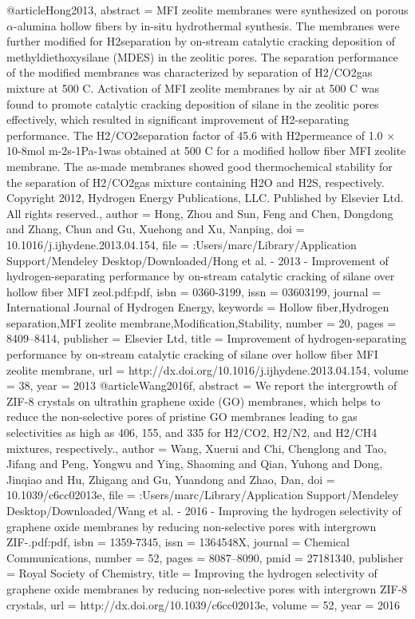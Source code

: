 @article{Hong2013,
abstract = {MFI zeolite membranes were synthesized on porous $\alpha$-alumina hollow fibers by in-situ hydrothermal synthesis. The membranes were further modified for H2separation by on-stream catalytic cracking deposition of methyldiethoxysilane (MDES) in the zeolitic pores. The separation performance of the modified membranes was characterized by separation of H2/CO2gas mixture at 500 C. Activation of MFI zeolite membranes by air at 500 C was found to promote catalytic cracking deposition of silane in the zeolitic pores effectively, which resulted in significant improvement of H2-separating performance. The H2/CO2separation factor of 45.6 with H2permeance of 1.0 × 10-8mol m-2s-1Pa-1was obtained at 500 C for a modified hollow fiber MFI zeolite membrane. The as-made membranes showed good thermochemical stability for the separation of H2/CO2gas mixture containing H2O and H2S, respectively. {\textcopyright} Copyright {\textcopyright} 2012, Hydrogen Energy Publications, LLC. Published by Elsevier Ltd. All rights reserved.},
author = {Hong, Zhou and Sun, Feng and Chen, Dongdong and Zhang, Chun and Gu, Xuehong and Xu, Nanping},
doi = {10.1016/j.ijhydene.2013.04.154},
file = {:Users/marc/Library/Application Support/Mendeley Desktop/Downloaded/Hong et al. - 2013 - Improvement of hydrogen-separating performance by on-stream catalytic cracking of silane over hollow fiber MFI zeol.pdf:pdf},
isbn = {0360-3199},
issn = {03603199},
journal = {International Journal of Hydrogen Energy},
keywords = {Hollow fiber,Hydrogen separation,MFI zeolite membrane,Modification,Stability},
number = {20},
pages = {8409--8414},
publisher = {Elsevier Ltd},
title = {{Improvement of hydrogen-separating performance by on-stream catalytic cracking of silane over hollow fiber MFI zeolite membrane}},
url = {http://dx.doi.org/10.1016/j.ijhydene.2013.04.154},
volume = {38},
year = {2013}
}
@article{Wang2016f,
abstract = {We report the intergrowth of ZIF-8 crystals on ultrathin graphene oxide (GO) membranes, which helps to reduce the non-selective pores of pristine GO membranes leading to gas selectivities as high as 406, 155, and 335 for H2/CO2, H2/N2, and H2/CH4 mixtures, respectively.},
author = {Wang, Xuerui and Chi, Chenglong and Tao, Jifang and Peng, Yongwu and Ying, Shaoming and Qian, Yuhong and Dong, Jinqiao and Hu, Zhigang and Gu, Yuandong and Zhao, Dan},
doi = {10.1039/c6cc02013e},
file = {:Users/marc/Library/Application Support/Mendeley Desktop/Downloaded/Wang et al. - 2016 - Improving the hydrogen selectivity of graphene oxide membranes by reducing non-selective pores with intergrown ZIF-.pdf:pdf},
isbn = {1359-7345},
issn = {1364548X},
journal = {Chemical Communications},
number = {52},
pages = {8087--8090},
pmid = {27181340},
publisher = {Royal Society of Chemistry},
title = {{Improving the hydrogen selectivity of graphene oxide membranes by reducing non-selective pores with intergrown ZIF-8 crystals}},
url = {http://dx.doi.org/10.1039/c6cc02013e},
volume = {52},
year = {2016}
}
